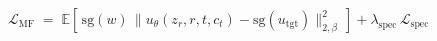 \documentclass[border=10pt,varwidth=\maxdimen]{standalone}
\begin{document}
\(\displaystyle \mathcal{L}_{\mathrm{MF}} \;=\; \mathbb{E}\!\left[\,\mathrm{sg}(w)\,\big\lVert u_\theta(z_r, r, t, c_t) - \mathrm{sg}(u_{\mathrm{tgt}}) \big\rVert_{2,\beta}^2\,\right] + \lambda_{\mathrm{spec}}\,\mathcal{L}_{\mathrm{spec}} \)
\end{document}
